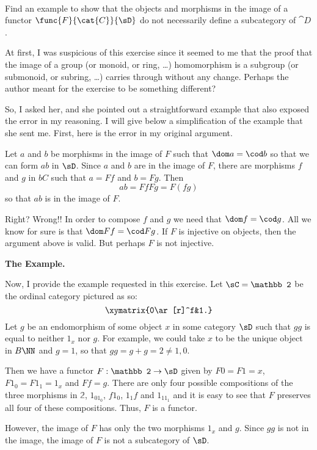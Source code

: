 \documentclass[main.tex]{subfiles}
\begin{document}
\paragraph{}
\begin{exercise}
Find an example to show that the objects and morphisms in the image of a functor
\(\func{F}{\cat{C}}{\sD}\) do not necessarily define a subcategory of
\(\cat{D}\).
\end{exercise}

At first, I was suspicious of this exercise since it seemed to me that the proof
that the image of a group (or monoid, or ring, \dots) homomorphism is a subgroup
(or submonoid, or subring, \dots) carries through without any change. Perhaps
the author meant for the exercise to be something different?

So, I asked her, and she pointed out a straightforward example that also exposed
the error in my reasoning. I will give below a simplification of the example
that she sent me. First, here is the error in my original argument.

Let \(a\) and \(b\) be morphisms in the image of \(F\) such that \(\dom a=\cod
b\) so that we can form \(ab\) in \(\sD\). Since \(a\) and \(b\) are in the
image of \(F\), there are morphisms \(f\) and \(g\) in \( bC\) such that
\(a=Ff\) and \(b=Fg\). Then \[ab=FfFg=F(fg)\] so that \(ab\) is in the image of
\(F\).

Right? Wrong!! In order to compose \(f\) and \(g\) we need that \(\dom f=\cod
g\). All we know for sure is that \(\dom Ff=\cod Fg\). If \(F\) is injective on
objects, then the argument above is valid. But perhaps \(F\) is not injective.

\begin{center}{\bf The Example.}\end{center} Now, I provide the example
requested in this exercise. Let \(\sC={\mathbb 2}\) be the ordinal category
pictured as so: \[\xymatrix{0\ar[r]^f&1.}\] Let \(g\) be an endomorphism of some
object \(x\) in some category \(\sD\) such that \(gg\) is equal to neither
\(1_x\) nor \(g\). For example, we could take \(x\) to be the unique object in
\(B\NN\) and \(g=1\), so that \(gg=g+g=2\ne 1,0\).

Then we have a functor \(F:{\mathbb 2}\rightarrow\sD\) given by \(F0=F1=x\),
\(F1_0=F1_1=1_x\) and \(Ff=g\). There are only four possible compositions of the
three morphisms in \({\mathbb 2}\), \(1_01_0\), \(f1_0\), \(1_1f\) and
\(1_11_1\) and it is easy to see that \(F\) preserves all four of these
compositions. Thus, \(F\) is a functor.

However, the image of \(F\) has only the two morphisms \(1_x\) and \(g\). Since
\(gg\) is not in the image, the image of \(F\) is not a subcategory of \(\sD\).
\end{document}

